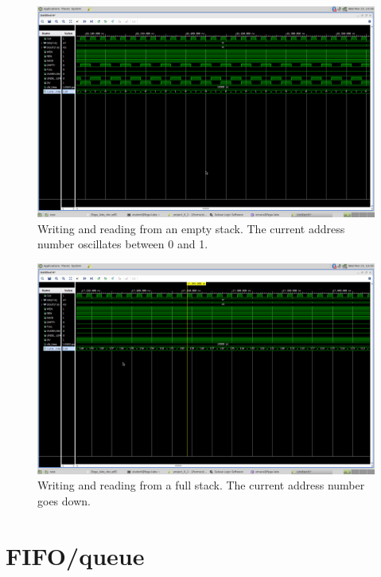 \begin{figure}
    \includegraphics[width=\textwidth]{L8/E2/sim_read_write_underflow_empty.png}
    \caption{Writing and reading from an empty stack. The current address number oscillates between 0 and 1.}
    \label{pic: w and r from e stack}
\end{figure}

\begin{figure}
    \includegraphics[width=\textwidth]{L8/E2/sim_read_write_full.png}
    \caption{Writing and reading from a full stack. The current address number goes down.}
    \label{pic: w and r from f stack}
\end{figure}

\section{FIFO/queue}

